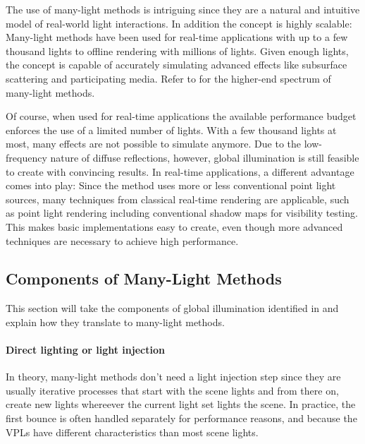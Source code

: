 
The use of many-light methods is intriguing since they are a natural and intuitive model of real-world light interactions. In addition the concept is highly scalable: Many-light methods have been used for real-time applications with up to a few thousand lights to offline rendering with millions of lights. Given enough lights, the concept is capable of accurately simulating advanced effects like subsurface scattering and participating media. Refer to \citet{Dachsbacher:2014:ManyLightsSTAR} for the higher-end spectrum of many-light methods.

Of course, when used for real-time applications the available performance budget enforces the use of a limited number of lights. With a few thousand lights at most, many effects are not possible to simulate anymore. Due to the low-frequency nature of diffuse reflections, however, global illumination is still feasible to create with convincing results. In real-time applications, a different advantage comes into play: Since the method uses more or less conventional point light sources, many techniques from classical real-time rendering are applicable, such as point light rendering including conventional shadow maps for visibility testing. This makes basic implementations easy to create, even though more advanced techniques are necessary to achieve high performance.



\subsection{Components of Many-Light Methods}
This section will take the components of global illumination identified in  and explain how they translate to many-light methods.

\paragraph{Direct lighting or light injection}
In theory, many-light methods don't need a light injection step since they are usually iterative processes that start with the scene lights and from there on, create new lights whereever the current light set lights the scene. In practice, the first bounce is often handled separately for performance reasons, and because the VPLs have different characteristics than most scene lights.

